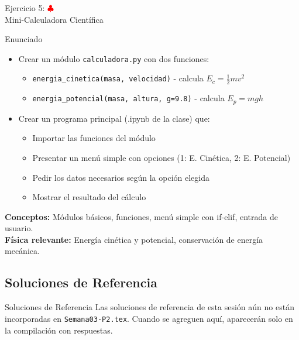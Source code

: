 \documentclass[10pt]{beamer}
\begin{document}
\begin{frame}{Ejercicio 5: \hfill \textcolor{red}{$\clubsuit$} \\ Mini-Calculadora Científica}
  \begin{block}{Enunciado}
    \begin{itemize}
      \item Crear un módulo \texttt{calculadora.py} con dos funciones:
        \begin{itemize}
          \item \texttt{energia\_cinetica(masa, velocidad)} - calcula $E_c = \frac{1}{2}mv^2$
          \item \texttt{energia\_potencial(masa, altura, g=9.8)} - calcula $E_p = mgh$
        \end{itemize}
      \item Crear un programa principal (.ipynb de la clase) que:
        \begin{itemize}
          \item Importar las funciones del módulo
          \item Presentar un menú simple con opciones (1: E. Cinética, 2: E. Potencial)
          \item Pedir los datos necesarios según la opción elegida
          \item Mostrar el resultado del cálculo
        \end{itemize}
    \end{itemize}
  \end{block}
  
  \textbf{Conceptos:} Módulos básicos, funciones, menú simple con if-elif, entrada de usuario.\\
  \textbf{Física relevante:} Energía cinética y potencial, conservación de energía mecánica.
\end{frame}

\begin{solutionblock}
\section{Soluciones de Referencia}
\begin{frame}{Soluciones de Referencia}
  \small
  Las soluciones de referencia de esta sesión aún no están incorporadas en
  \texttt{Semana03-P2.tex}. Cuando se agreguen aquí, aparecerán solo en la
  compilación con respuestas.
\end{frame}
\end{solutionblock}
\end{document}
